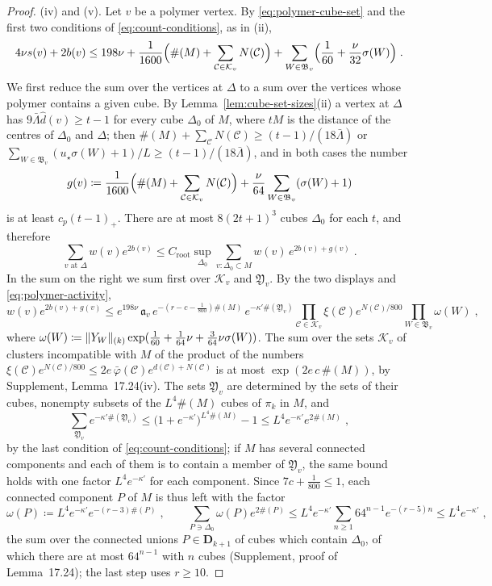 \documentclass[11pt]{preprint}
\DeclarePairedDelimiter{\norm}{\lVert}{\rVert}
\numberwithin{equation}{section}
\theoremstyle{definition}
\theoremstyle{remark}
\theoremstyle{plain}
\begin{document}
\begin{proof}
(iv) and (v). Let $v$ be a polymer vertex. By \eqref{eq:polymer-cube-set} and the first two conditions of \eqref{eq:count-conditions}, as in (ii),
\[
    4\nu s(v) + 2b(v) \leq 198\nu + \frac{1}{1600}\Bigl(\#(M) + \sum_{\mathcal C \in \mathcal K_v}N(\mathcal C)\Bigr) + \sum_{W \in \mathfrak B_v}\Bigl(\frac{1}{60} + \frac{\nu}{32}\sigma(W)\Bigr)\;.
\]
We first reduce the sum over the vertices at $\Delta$ to a sum over the vertices whose polymer contains a given cube. By Lemma~\ref{lem:cube-set-sizes}(ii) a vertex at $\Delta$ has $9\bar\Lambda\hat d(v) \geq t - 1$ for every cube $\Delta_0$ of $M$, where $tM$ is the distance of the centres of $\Delta_0$ and $\Delta$; then $\#(M) + \sum_{\mathcal C}N(\mathcal C) \geq (t - 1)/(18\bar\Lambda)$ or $\sum_{W \in \mathfrak B_v}(u_\star\sigma(W) + 1)/L \geq (t - 1)/(18\bar\Lambda)$, and in both cases the number
\[
    g(v) \coloneqq \frac{1}{1600}\Bigl(\#(M) + \sum_{\mathcal C \in \mathcal K_v}N(\mathcal C)\Bigr) + \frac{\nu}{64}\sum_{W \in \mathfrak B_v}(\sigma(W) + 1)
\]
is at least $c_p(t - 1)_+$. There are at most $8(2t + 1)^3$ cubes $\Delta_0$ for each $t$, and therefore
\begin{equation}\label{eq:root-reduction}
    \sum_{v \text{ at } \Delta}w(v)e^{2b(v)} \leq C_{\mathrm{root}}\sup_{\Delta_0}\sum_{v\colon \Delta_0 \subset M}w(v)\,e^{2b(v) + g(v)}\;.
\end{equation}
In the sum on the right we sum first over $\mathcal K_v$ and $\mathfrak Y_v$. By the two displays and \eqref{eq:polymer-activity},
\[
    w(v)e^{2b(v) + g(v)} \leq e^{198\nu}\,\mathfrak a_v\,e^{-(r - c - \frac{1}{800})\#(M)}\,e^{-\kappa'\#(\mathfrak Y_v)}\prod_{\mathcal C \in \mathcal K_v}\xi(\mathcal C)e^{N(\mathcal C)/800}\prod_{W \in \mathfrak B_v}\omega(W)\;,
\]
where $\omega(W) \coloneqq \norm{Y_W}_{(k)}\exp(\frac{1}{60} + \frac{1}{64}\nu + \frac{3}{64}\nu\sigma(W))$.
The sum over the sets $\mathcal K_v$ of clusters incompatible with $M$ of the product of the numbers $\xi(\mathcal C)e^{N(\mathcal C)/800} \leq 2e\,\bar\varphi(\mathcal C)e^{d(\mathcal C) + N(\mathcal C)}$ is at most $\exp(2e\,c\,\#(M))$, by Supplement, Lemma~17.24(iv). The sets $\mathfrak Y_v$ are determined by the sets of their cubes, nonempty subsets of the $L^4\#(M)$ cubes of $\pi_k$ in $M$, and
\[
    \sum_{\mathfrak Y_v}e^{-\kappa'\#(\mathfrak Y_v)} \leq \bigl(1 + e^{-\kappa'}\bigr)^{L^4\#(M)} - 1 \leq L^4e^{-\kappa'}e^{2\#(M)}\;,
\]
by the last condition of \eqref{eq:count-conditions}; if $M$ has several connected components and each of them is to contain a member of $\mathfrak Y_v$, the same bound holds with one factor $L^4e^{-\kappa'}$ for each component. Since $7c + \frac{1}{800} \leq 1$, each connected component $P$ of $M$ is thus left with the factor
\[
    \omega(P) \coloneqq L^4e^{-\kappa'}e^{-(r - 3)\#(P)}\;,
    \qquad
    \sum_{P \ni \Delta_0}\omega(P)e^{2\#(P)} \leq L^4e^{-\kappa'}\sum_{n \geq 1}64^{n-1}e^{-(r - 5)n} \leq L^4e^{-\kappa'}\;,
\]
the sum over the connected unions $P \in \mathbf D_{k+1}$ of cubes which contain $\Delta_0$, of which there are at most $64^{n-1}$ with $n$ cubes (Supplement, proof of Lemma~17.24); the last step uses $r \geq 10$.


\end{proof}
\end{document}
